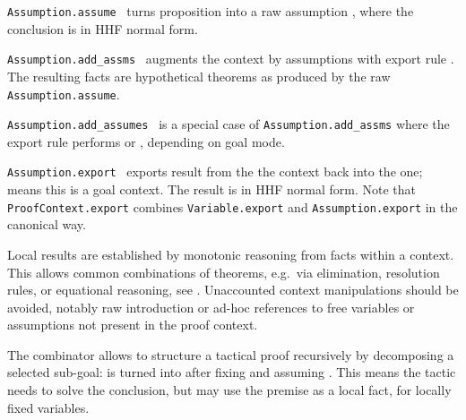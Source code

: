 \begin{isabellebody}
\begin{isamarkuptext}
\begin{description}
  \item \verb|Assumption.assume|~ turns proposition  into a raw assumption , where the conclusion
   is in HHF normal form.

  \item \verb|Assumption.add_assms|~ augments the context
  by assumptions  with export rule .  The
  resulting facts are hypothetical theorems as produced by the raw
  \verb|Assumption.assume|.

  \item \verb|Assumption.add_assumes|~ is a special case of
  \verb|Assumption.add_assms| where the export rule performs  or , depending on goal mode.

  \item \verb|Assumption.export|~
  exports result  from the the  context
  back into the  one;  means
  this is a goal context.  The result is in HHF normal form.  Note
  that \verb|ProofContext.export| combines \verb|Variable.export|
  and \verb|Assumption.export| in the canonical way.

  \end{description}%
\end{isamarkuptext}%
\isamarkuptrue%
%
\endisatagmlref
{\isafoldmlref}%
%
\isadelimmlref
%
\endisadelimmlref
%
\isamarkuptrue%
%
\begin{isamarkuptext}%
Local results are established by monotonic reasoning from facts
  within a context.  This allows common combinations of theorems,
  e.g.\ via \isa{{\isasymAnd}{\isacharslash}{\isasymLongrightarrow}} elimination, resolution rules, or equational
  reasoning, see .  Unaccounted context manipulations
  should be avoided, notably raw \isa{{\isasymAnd}{\isacharslash}{\isasymLongrightarrow}} introduction or ad-hoc
  references to free variables or assumptions not present in the proof
  context.

  \medskip The  combinator allows to structure a
  tactical proof recursively by decomposing a selected sub-goal:
   is turned into 
  after fixing  and assuming .  This means
  the tactic needs to solve the conclusion, but may use the premise as
  a local fact, for locally fixed variables.


\end{isamarkuptext}
\end{isabellebody}
